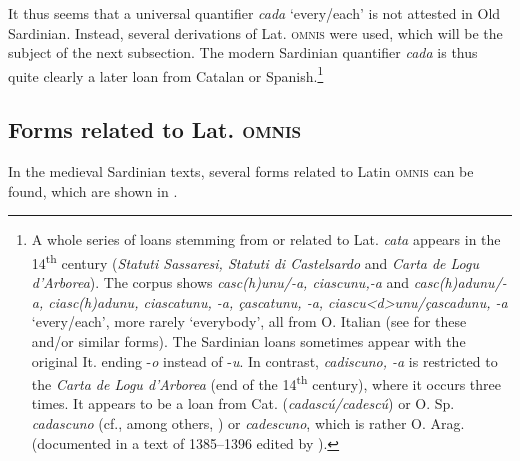 \documentclass[output=paper,colorlinks,citecolor=brown]{langscibook}
\begin{document}
It thus seems that a universal quantifier \textit{cada} ‘every/each’ is not attested in Old Sardinian. Instead, several derivations of Lat. \textsc{omnis} were used, which will be the subject of the next subsection. The modern Sardinian quantifier \textit{cada} is thus quite clearly a later loan from Catalan or Spanish.\footnote{A whole series of loans stemming from or related to Lat. \textit{cata} appears in the 14\textsuperscript{th} century (\textit{Statuti Sassaresi, Statuti di Castelsardo} and \textit{Carta de Logu d’Arborea}). The corpus shows \textit{casc(h)unu/-a, ciascunu,-a} and \textit{casc(h)adunu/-a, ciasc(h)adunu, ciascatunu, -a, çascatunu, -a, ciascu<d>unu/çascadunu, -a} ‘every/each’, more rarely ‘everybody’, all from O. Italian (see \cite[][220--221]{Rohlfs1969} for these and/or similar forms). The Sardinian loans sometimes appear with the original It. ending -\textit{o} instead of -\textit{u}. In contrast, \textit{cadiscuno, -a} is restricted to the \textit{Carta de Logu d’Arborea} (end of the 14\textsuperscript{th} century), where it occurs three times. It appears to be a loan from Cat. (\textit{cadascú/cadescú}) or O. Sp. \textit{cadascuno} (cf., among others, \cite[][396]{Malkiel1948}) or \textit{cadescuno}, which is rather O. Arag. (documented in a text of 1385--1396 edited by \cite{Cacho2003}).}

\subsection{Forms related to Lat. \textsc{omnis}}\label{sec:men4.2}\largerpage[-1]
In the medieval Sardinian texts, several forms related to Latin \textsc{omnis} can be found, which are shown in .
\end{document}
